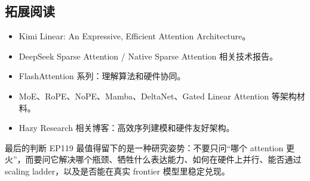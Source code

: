 \documentclass[a4paper]{article}
\begin{document}
\subsection{拓展阅读}

\begin{itemize}
\item Kimi Linear: An Expressive, Efficient Attention Architecture。
\item DeepSeek Sparse Attention / Native Sparse Attention 相关技术报告。
\item FlashAttention 系列：理解算法和硬件协同。
\item MoE、RoPE、NoPE、Mamba、DeltaNet、Gated Linear Attention 等架构材料。
\item Hazy Research 相关博客：高效序列建模和硬件友好架构。
\end{itemize}

\begin{importantbox}{最后的判断}
EP119 最值得留下的是一种研究姿势：不要只问“哪个 attention 更火”，而要问它解决哪个瓶颈、牺牲什么表达能力、如何在硬件上并行、能否通过 scaling ladder，以及是否能在真实 frontier 模型里稳定兑现。
\end{importantbox}
\end{document}
